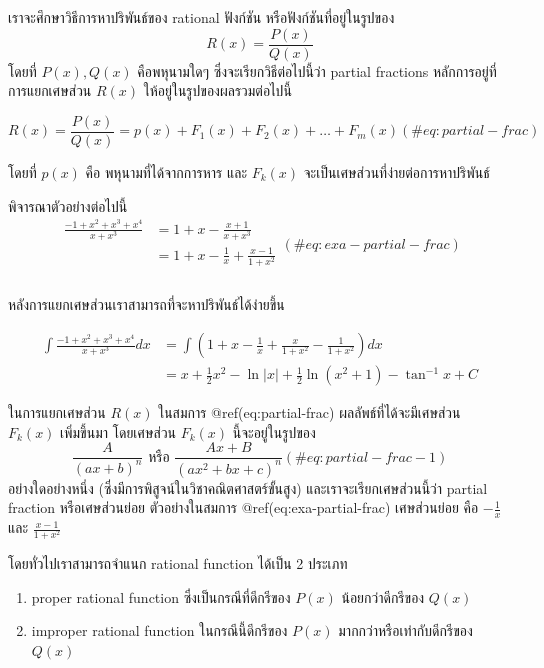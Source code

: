 \documentclass[
]{book}
\begin{document}
เราจะศึกษาวิธีการหาปริพันธ์ของ rational ฟังก์ชัน หรือฟังก์ชันที่อยู่ในรูปของ
\[R(x) = \frac{P(x)}{Q(x)}\] โดยที่ \(P(x),Q(x)\) คือพหุนามใดๆ
ซึ่งจะเรียกวิธีต่อไปนี้ว่า partial fractions หลักการอยู่ที่การแยกเศษส่วน \(R(x)\)
ให้อยู่ในรูปของผลรวมต่อไปนี้

\begin{equation}
    R(x) = \frac{P(x)}{Q(x)} = p(x) + F_1(x) + F_2(x) + \ldots + F_m(x)
    (\#eq:partial-frac)
\end{equation}

โดยที่ \(p(x)\) คือ พหุนามที่ได้จากการหาร และ \(F_k(x)\)
จะเป็นเศษส่วนที่ง่ายต่อการหาปริพันธ์

พิจารณาตัวอย่างต่อไปนี้ \begin{equation}
     \begin{split}
        \frac{-1+x^2+x^3+x^4}{x + x^3} &= 1 +x - \frac{x+1}{x + x^3}  \\
                                       &= 1 +x -\frac{1}{x} + \frac{x-1}{1+x^2} \\
     \end{split}
     (\#eq:exa-partial-frac)
\end{equation}\\
หลังการแยกเศษส่วนเราสามารถที่จะหาปริพันธ์ได้ง่ายขึ้น

\begin{equation}
\begin{aligned}
        \int \frac{-1+x^2+x^3+x^4}{x + x^3}dx &= \int\left(1 +x -\frac{1}{x} + \frac{x}{1+x^2} -\frac{1}{1+x^2}\right)dx \\   
            &=x + \frac{1}{2}x^2 - \ln|x| +\frac{1}{2}\ln(x^2+1) -\tan^{-1}x + C
\end{aligned}
\end{equation}

ในการแยกเศษส่วน \(R(x)\) ในสมการ @ref(eq:partial-frac) ผลลัพธ์ที่ได้จะมีเศษส่วน
\(F_k(x)\) เพิ่มขึ้นมา โดยเศษส่วน \(F_k(x)\) นี้จะอยู่ในรูปของ \begin{equation}
     \frac{A}{(ax + b)^n} \text{ หรือ } \frac{Ax + B}{(ax^2 + bx +c)^n}
     (\#eq:partial-frac-1)
\end{equation} อย่างใดอย่างหนึ่ง (ซึ่งมีการพิสูจน์ในวิชาคณิตศาสตร์ขั้นสูง)
และเราจะเรียกเศษส่วนนี้ว่า partial fraction หรือเศษส่วนย่อย ตัวอย่างในสมการ
@ref(eq:exa-partial-frac) เศษส่วนย่อย คือ \(-\frac{1}{x}\) และ
\(\frac{x-1}{1+x^2}\)

โดยทั่วไปเราสามารถจำแนก rational function ได้เป็น 2 ประเภท

\begin{enumerate}
\def\labelenumi{\arabic{enumi}.}
\item
  proper rational function ซึ่งเป็นกรณีที่ดีกรีของ \(P(x)\) น้อยกว่าดีกรีของ
  \(Q(x)\)
\item
  improper rational function ในกรณีนี้ดีกรีของ \(P(x)\) มากกว่าหรือเท่ากับดีกรีของ
  \(Q(x)\)
\end{enumerate}
\end{document}
